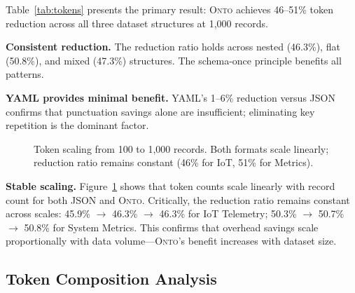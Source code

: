 \documentclass[10pt,twocolumn]{article}
\newcommand{\onto}{\textsc{Onto}\xspace}
\begin{document}
Table~\ref{tab:tokens} presents the primary result: \onto achieves 46--51\% token reduction across all three dataset structures at 1,000 records.

\textbf{Consistent reduction.} The reduction ratio holds across nested (46.3\%), flat (50.8\%), and mixed (47.3\%) structures. The schema-once principle benefits all patterns.

\textbf{YAML provides minimal benefit.} YAML's 1--6\% reduction versus JSON confirms that punctuation savings alone are insufficient; eliminating key repetition is the dominant factor.

\begin{figure}[t]
\centering
{}
\caption{Token scaling from 100 to 1,000 records. Both formats scale linearly; reduction ratio remains constant (46\% for IoT, 51\% for Metrics).}
\label{fig:scaling}
\end{figure}

\textbf{Stable scaling.} Figure~\ref{fig:scaling} shows that token counts scale linearly with record count for both JSON and \onto. Critically, the reduction ratio remains constant across scales: 45.9\% $\rightarrow$ 46.3\% $\rightarrow$ 46.3\% for IoT Telemetry; 50.3\% $\rightarrow$ 50.7\% $\rightarrow$ 50.8\% for System Metrics. This confirms that overhead savings scale proportionally with data volume---\onto's benefit increases with dataset size.

\subsection{Token Composition Analysis}
\end{document}
